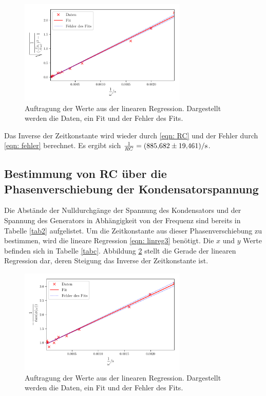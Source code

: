 \begin{figure}
  \centering
  \includegraphics[width=8cm, height=5cm]{build/plotb.pdf}
  \caption{Auftragung der Werte aus der linearen Regression. Dargestellt werden die Daten, ein Fit und der Fehler des Fits.}
  \label{fig:plotb}
\end{figure}

Das Inverse der Zeitkonstante wird wieder durch \eqref{eqn: RC} und der Fehler durch \eqref{eqn: fehler}
berechnet. Es ergibt sich $\frac{1}{RC} = \SI{885.682  \pm 19.461}{\per\second}$.

\subsection{Bestimmung von RC über die Phasenverschiebung der Kondensatorspannung}
\label{sec: c}
Die Abstände der Nulldurchgänge der Spannung des Kondensators und der Spannung des Generators in Abhängigkeit
von der Frequenz sind bereits in Tabelle \ref{tab2} aufgelistet.
Um die Zeitkonstante aus dieser Phasenverschiebung zu bestimmen, wird die lineare Regression \eqref{eqn: linreg3} benötigt.
Die $x$ und $y$ Werte befinden sich in Tabelle \ref{tabc}. Abbildung \ref{fig:plotc} stellt die Gerade der
linearen Regression dar, deren Steigung das Inverse der Zeitkonstante ist.


\begin{figure}
  \centering
  \includegraphics[width=8cm, height=5cm]{build/plotc.pdf}
  \caption{Auftragung der Werte aus der linearen Regression. Dargestellt werden die Daten, ein Fit und der Fehler des Fits.}
  \label{fig:plotc}
\end{figure}

